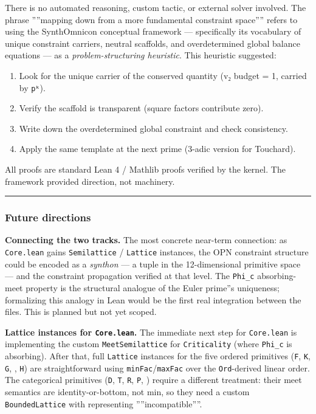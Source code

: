\documentclass[10pt,a4paper]{article}
\begin{document}
There is no automated reasoning, custom tactic, or external solver involved. The phrase
''''mapping down from a more fundamental constraint space'''' refers to using the SynthOmnicon
conceptual framework --- specifically its vocabulary of unique constraint carriers, neutral
scaffolds, and overdetermined global balance equations --- as a \emph{problem-structuring heuristic}.
This heuristic suggested:

\begin{enumerate}
    \item Look for the unique carrier of the conserved quantity (v₂ budget = 1, carried by \texttt{pᵏ}).
    \item Verify the scaffold is transparent (square factors contribute zero).
    \item Write down the overdetermined global constraint and check consistency.
    \item Apply the same template at the next prime (3-adic version for Touchard).
\end{enumerate}

All proofs are standard Lean 4 / Mathlib proofs verified by the kernel. The framework provided
direction, not machinery.

\begin{center}
\rule{0.5\textwidth}{0.4pt}
\end{center}

\subsubsection{Future directions}

\textbf{Connecting the two tracks.} The most concrete near-term connection: as \texttt{Core.lean} gains
\texttt{Semilattice} / \texttt{Lattice} instances, the OPN constraint structure could be encoded as a
\emph{synthon} --- a tuple in the 12-dimensional primitive space --- and the constraint propagation
verified at that level. The \texttt{Phi\_c} absorbing-meet property is the structural analogue of
the Euler prime''s uniqueness; formalizing this analogy in Lean would be the first real
integration between the files. This is planned but not yet scoped.

\textbf{Lattice instances for \texttt{Core.lean}.} The immediate next step for \texttt{Core.lean} is implementing
the custom \texttt{MeetSemilattice} for \texttt{Criticality} (where \texttt{Phi\_c} is absorbing). After that, full
\texttt{Lattice} instances for the five ordered primitives (\texttt{F}, \texttt{K}, \texttt{G}, \texttt{\Omega}, \texttt{H}) are
straightforward using \texttt{minFac}/\texttt{maxFac} over the \texttt{Ord}-derived linear order. The categorical
primitives (\texttt{D}, \texttt{T}, \texttt{R}, \texttt{P}, \texttt{\Gamma}) require a different treatment: their meet semantics are
identity-or-bottom, not min, so they need a custom \texttt{BoundedLattice} with \texttt{\perp} representing
''''incompatible''''.
\end{document}
